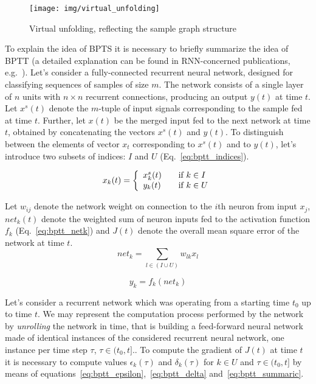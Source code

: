\begin{figure}
\begin{center}
	\texttt{[image: img/virtual\_unfolding]}
	\caption{Virtual unfolding, reflecting the sample graph structure}
	\label{fig:virtual_unfolding}
\end{center}
\end{figure}

To explain the idea of BPTS it is necessary to briefly summarize the idea of BPTT (a detailed explanation can be found in RNN-concerned publications, e.g.~\cite{williams1995gradient}). Let's consider a fully-connected recurrent neural network, designed for classifying sequences of samples of size $m$. The network consists of a single layer of $n$ units with $n \times n$ recurrent connections, producing an output $y(t)$ at time $t$. Let $x^{s}(t)$ denote the $m$-tuple of input signals corresponding to the sample fed at time $t$. Further, let $x(t)$ be the merged input fed to the next network at time $t$, obtained by concatenating the vectors $x^{s}(t)$ and $y(t)$. To distinguish between the elements of vector $x_t$ corresponding to $x^{s}(t)$ and to $y(t)$, let's introduce two subsets of indices: $I$ and $U$ (Eq.~\ref{eq:bptt_indices}).

\begin{equation}
x_k(t) = \left\{
\begin{array}{l l}
	x^{s}_{k}(t)	& \quad \text{if $k \in I$} \\
	y_k(t)	& \quad \text{if $k \in U$}\\
\end{array} \right.
\label{eq:bptt_indices}
\end{equation}

\noindent Let $w_{ij}$ denote the network weight on connection to the $i$th neuron from input $x_j$, $net_k(t)$ denote the weighted sum of neuron inputs fed to the activation function $f_k$ (Eq.~\ref{eq:bptt_netk}) and $J(t)$ denote the overall mean square error of the network at time $t$.
\begin{equation}
net_k = \sum_{l \in (I \cup U)} w_{lk} x_l
\label{eq:bptt_netk}
\end{equation}

\begin{equation}
y_k = f_k(net_k)
\label{eq:bptt_f}
\end{equation}

\noindent Let's consider a recurrent network which was operating from a starting time $t_0$ up to time $t$. We may represent the computation process performed by the network by \emph{unrolling} the network in time, that is building a feed-forward neural network made of identical instances of the considered recurrent neural network, one instance per time step $\tau$, $\tau \in (t_0, t]$.. To compute the gradient of $J(t)$ at time $t$ it is necessary to compute values $\epsilon_k(\tau)$ and $\delta_k(\tau)$ for $k \in U$ and $\tau \in (t_0, t]$ by means of equations~\ref{eq:bptt_epsilon},~\ref{eq:bptt_delta} and~\ref{eq:bptt_summaric}.

